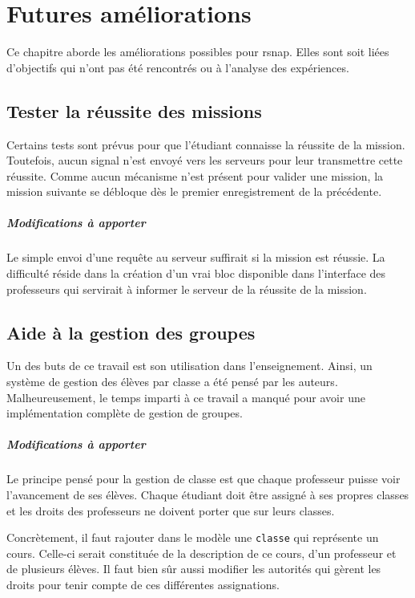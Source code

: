 \chapter{Futures améliorations}
Ce chapitre aborde les améliorations possibles pour \gls{rsnap}. Elles sont soit liées d'objectifs qui n'ont pas été rencontrés ou à l'analyse des expériences.

\section{Tester la réussite des missions}
Certains tests sont prévus pour que l'étudiant connaisse la réussite de la \gls{mission}. Toutefois, aucun signal n'est envoyé vers les serveurs pour leur transmettre cette réussite. Comme aucun mécanisme n'est présent pour valider une \gls{mission}, la \gls{mission} suivante se débloque dès le premier enregistrement de la précédente.

\paragraph{Modifications à apporter}
Le simple envoi d'une requête au serveur suffirait si la \gls{mission} est réussie. La difficulté réside dans la création d'un vrai \gls{bloc} disponible dans l'interface des professeurs qui servirait à informer le serveur de la réussite de la \gls{mission}.

\section{Aide à la gestion des groupes}
Un des buts de ce travail est son utilisation dans l'enseignement. Ainsi, un système de gestion des élèves par classe a été pensé par les auteurs. Malheureusement, le temps imparti à ce travail a manqué pour avoir une implémentation complète de gestion de groupes.

\paragraph{Modifications à apporter}
Le principe pensé pour la gestion de classe est que chaque professeur puisse voir l'avancement de ses élèves. Chaque étudiant doit être assigné à ses propres classes et les droits des professeurs ne doivent porter que sur leurs classes.

Concrètement, il faut rajouter dans le modèle une \texttt{classe} qui représente un cours. Celle-ci serait constituée de la description de ce cours, d'un professeur et de plusieurs élèves. Il faut bien sûr aussi modifier les autorités qui gèrent les droits pour tenir compte de ces différentes assignations.

